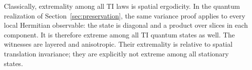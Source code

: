 Classically, extremality among all TI laws is spatial ergodicity. In the quantum realization of Section~\ref{sec:preservation}, the same variance proof applies to every local Hermitian observable: the state is diagonal and a product over slices in each component. It is therefore extreme among all TI quantum states as well. The witnesses are layered and anisotropic. Their extremality is relative to spatial translation invariance; they are explicitly not extreme among all stationary states.





